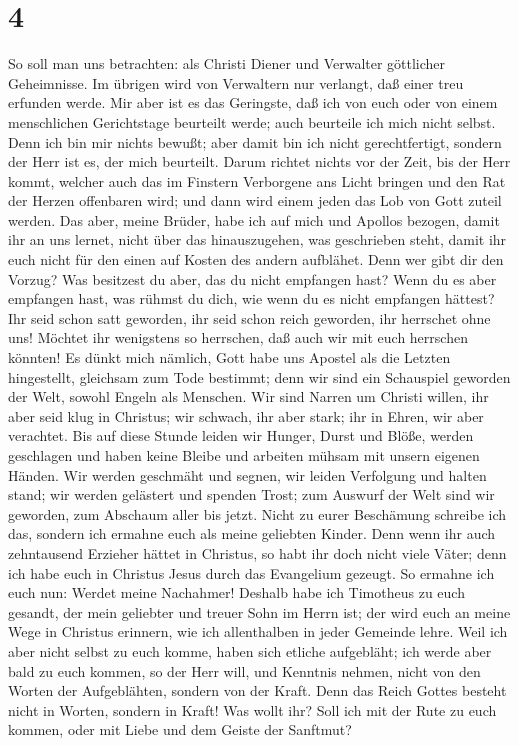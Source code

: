 \hypertarget{section-3}{%
\section{4}\label{section-3}}

 So soll man uns betrachten: als Christi Diener und
Verwalter göttlicher Geheimnisse.  Im übrigen wird von
Verwaltern nur verlangt, daß einer treu erfunden werde. 
Mir aber ist es das Geringste, daß ich von euch oder von einem
menschlichen Gerichtstage beurteilt werde; auch beurteile ich mich nicht
selbst.  Denn ich bin mir nichts bewußt; aber damit bin
ich nicht gerechtfertigt, sondern der Herr ist es, der mich beurteilt.
 Darum richtet nichts vor der Zeit, bis der Herr kommt,
welcher auch das im Finstern Verborgene ans Licht bringen und den Rat
der Herzen offenbaren wird; und dann wird einem jeden das Lob von Gott
zuteil werden.  Das aber, meine Brüder, habe ich auf mich
und Apollos bezogen, damit ihr an uns lernet, nicht über das
hinauszugehen, was geschrieben steht, damit ihr euch nicht für den einen
auf Kosten des andern aufblähet.  Denn wer gibt dir den
Vorzug? Was besitzest du aber, das du nicht empfangen hast? Wenn du es
aber empfangen hast, was rühmst du dich, wie wenn du es nicht empfangen
hättest?  Ihr seid schon satt geworden, ihr seid schon
reich geworden, ihr herrschet ohne uns! Möchtet ihr wenigstens so
herrschen, daß auch wir mit euch herrschen könnten!  Es
dünkt mich nämlich, Gott habe uns Apostel als die Letzten hingestellt,
gleichsam zum Tode bestimmt; denn wir sind ein Schauspiel geworden der
Welt, sowohl Engeln als Menschen.  Wir sind Narren um
Christi willen, ihr aber seid klug in Christus; wir schwach, ihr aber
stark; ihr in Ehren, wir aber verachtet.  Bis auf diese
Stunde leiden wir Hunger, Durst und Blöße, werden geschlagen und haben
keine Bleibe und arbeiten mühsam mit unsern eigenen Händen.
 Wir werden geschmäht und segnen, wir leiden Verfolgung
und halten stand; wir werden gelästert und spenden Trost;
 zum Auswurf der Welt sind wir geworden, zum Abschaum
aller bis jetzt.  Nicht zu eurer Beschämung schreibe ich
das, sondern ich ermahne euch als meine geliebten Kinder.
 Denn wenn ihr auch zehntausend Erzieher hättet in
Christus, so habt ihr doch nicht viele Väter; denn ich habe euch in
Christus Jesus durch das Evangelium gezeugt.  So ermahne
ich euch nun: Werdet meine Nachahmer!  Deshalb habe ich
Timotheus zu euch gesandt, der mein geliebter und treuer Sohn im Herrn
ist; der wird euch an meine Wege in Christus erinnern, wie ich
allenthalben in jeder Gemeinde lehre.  Weil ich aber
nicht selbst zu euch komme, haben sich etliche aufgebläht;
 ich werde aber bald zu euch kommen, so der Herr will,
und Kenntnis nehmen, nicht von den Worten der Aufgeblähten, sondern von
der Kraft.  Denn das Reich Gottes besteht nicht in
Worten, sondern in Kraft!  Was wollt ihr? Soll ich mit
der Rute zu euch kommen, oder mit Liebe und dem Geiste der Sanftmut?

